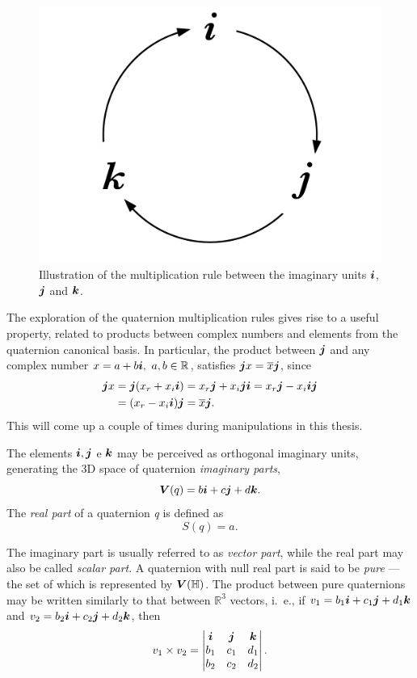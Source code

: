 \begin{figure}
	\centering
	\includegraphics[width=0.2\linewidth]{Figures/quaternion_multiplication.pdf}
	\caption{Illustration of the multiplication rule between the imaginary units $ \boldsymbol{i} $, $ \boldsymbol{j} $ and $ \boldsymbol{k} $.}
	\label{fig:quatmult}
\end{figure}

The exploration of the quaternion multiplication rules gives rise to a useful property, related to products between complex numbers and elements from the quaternion canonical basis. In particular, the product between $\boldsymbol{j}$ and any complex number $x = a + b \boldsymbol{i} , \ a, b \in \mathbb{R}$, satisfies $\boldsymbol{j} x = \overline{x} \boldsymbol{j}$, since
\begin{equation}
\label{eq:commutej}
\begin{aligned}
\boldsymbol{j} x &= \boldsymbol{j} (x_r + x_i \boldsymbol{i}) = x_r \boldsymbol{j} + x_i \boldsymbol{j} \boldsymbol{i} = x_r \boldsymbol{j} - x_i \boldsymbol{i} \boldsymbol{j} \\
&= (x_r - x_i \boldsymbol{i}) \boldsymbol{j} = \overline{x} \boldsymbol{j}.
\end{aligned}
\end{equation}
This will come up a couple of times during manipulations in this thesis.

The elements $\boldsymbol{i}, \boldsymbol{j}$ e $\boldsymbol{k}$ may be perceived as orthogonal imaginary units, generating the 3D space of quaternion \textit{imaginary parts},
\begin{equation}
\boldsymbol{V} (q) = b\boldsymbol{i} + c\boldsymbol{j} + d\boldsymbol{k}.
\end{equation}
The \emph{real part} of a quaternion \emph{q} is defined as
\begin{equation}
S(q) = a.
\end{equation}

The imaginary part is usually referred to as \textit{vector part}, while the real part may also be called \textit{scalar part}. A quaternion with null real part is said to be \textit{pure} --- the set of which is represented by $\boldsymbol{V}(\mathbb{H})$. The product between pure quaternions may be written similarly to that between $\mathbb{R}^3$ vectors, i.~e., if $v_1 = b_1\boldsymbol{i} + c_1\boldsymbol{j} + d_1\boldsymbol{k}$ and $v_2 = b_2\boldsymbol{i} + c_2\boldsymbol{j} + d_2\boldsymbol{k}$, then
\begin{equation}
v_1 \times v_2 = 
\begin{vmatrix}
\boldsymbol{i} & \boldsymbol{j} & \boldsymbol{k}\\ 
b_1 & c_1 & d_1\\ 
b_2 & c_2 & d_2
\end{vmatrix}.
\end{equation}

